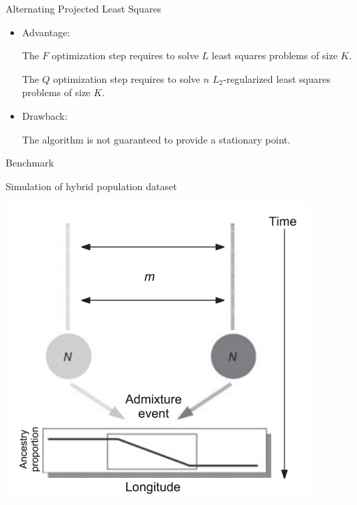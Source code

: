 \documentclass{beamer}\usepackage[]{graphicx}\usepackage[]{color}
\begin{document}
\begin{frame}{Alternating Projected Least Squares}

\begin{itemize}

\item Advantage:

The $F$ optimization step requires to solve $L$ least squares problems of size $K$.

The $Q$ optimization step requires to solve $n$ $L_2$-regularized least squares problems of size $K$.

\item Drawback:

The algorithm is not guaranteed to provide a stationary point.

\end{itemize}

\end{frame}

\begin{frame}{Benchmark}

Simulation of hybrid population dataset~\citep{franccois2010spatially}
\begin{center}
\includegraphics[width=.70\linewidth]{addmixed.png}
\end{center}

\end{frame}

\end{document}
